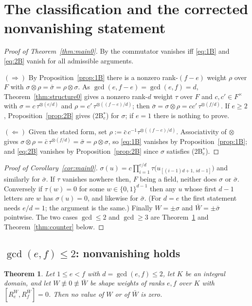 \documentclass[11pt]{article}
\newtheorem{theorem}{Theorem}[section]
\theoremstyle{definition}
\theoremstyle{remark}
\begin{document}
\section{The classification and the corrected nonvanishing statement}\label{sec:main}

\begin{proof}[Proof of Theorem~\ref{thm:main0}]
By \cite[Lemma 4.1]{Q149} the commutator vanishes iff \eqref{eq:1B} and \eqref{eq:2B} vanish
for all admissible arguments.

$(\Rightarrow)$  By Proposition~\ref{prop:1B} there is a nonzero rank-$(f-e)$ weight $\rho$
over $F$ with $\sigma\otimes\rho=\bar\sigma=\rho\otimes\sigma$.  As
$\gcd(e,f-e)=\gcd(e,f)=d$, Theorem~\ref{thm:structure0} gives a nonzero rank-$d$ weight
$\tau$ over $F$ and $c,c'\in F^\times$ with $\sigma=c\,\tau^{\otimes(e/d)}$ and
$\rho=c'\,\tau^{\otimes((f-e)/d)}$; then
$\bar\sigma=\sigma\otimes\rho=cc'\,\tau^{\otimes(f/d)}$.  If $e\ge2$,
Proposition~\ref{prop:2B} gives (2B$^*_e$) for $\sigma$; if $e=1$ there is nothing to prove.

$(\Leftarrow)$  Given the stated form, set $\rho:=\bar c\,c^{-1}\tau^{\otimes((f-e)/d)}$.
Associativity of $\otimes$ gives $\sigma\otimes\rho=\bar c\,\tau^{\otimes(f/d)}=\bar\sigma
=\rho\otimes\sigma$, so \eqref{eq:1B} vanishes by Proposition~\ref{prop:1B}; and
\eqref{eq:2B} vanishes by Proposition~\ref{prop:2B} since $\sigma$ satisfies (2B$^*_e$).
\end{proof}

\begin{proof}[Proof of Corollary~\ref{cor:main0}]
$\sigma(u)=c\prod_{i=1}^{e/d}\tau\bigl(u_{[(i-1)d+1,\,id-1]}\bigr)$ and similarly for
$\bar\sigma$.  If $\tau$ vanishes nowhere then, $F$ being a field, neither does $\sigma$ or
$\bar\sigma$.  Conversely if $\tau(w)=0$ for some $w\in\{0,1\}^{d-1}$ then any $u$ whose
first $d-1$ letters are $w$ has $\sigma(u)=0$, and likewise for $\bar\sigma$.  (For $d=e$ the
first statement needs $e/d=1$; the argument is the same.)  Finally $W=\pm\sigma$ and
$\bar W=\pm\bar\sigma$ pointwise.  The two cases $\gcd\le2$ and $\gcd\ge3$ are
Theorem~\ref{thm:gcdle2} and Theorem~\ref{thm:counter} below.
\end{proof}

\subsection{$\gcd(e,f)\le2$: nonvanishing holds}

\begin{theorem}\label{thm:gcdle2}
Let $1\le e<f$ with $d=\gcd(e,f)\le2$, let $K$ be an integral domain, and let
$W\not\equiv0\not\equiv\bar W$ be shape weights of ranks $e,f$ over $K$ with
$[R_e^{W},R_f^{\bar W}]=0$.  Then no value of $W$ or of $\bar W$ is zero.
\end{theorem}
\end{document}
